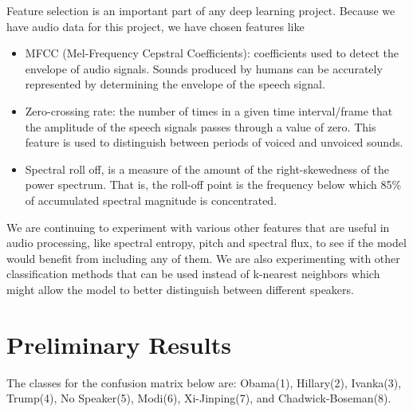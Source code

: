 \documentclass[10pt,twocolumn,letterpaper]{article}
\begin{document}
Feature selection is an important part of any deep learning project. Because we have audio data for this project, we have chosen features like 
\begin{itemize}
    \item MFCC (Mel-Frequency Cepstral Coefficients): coefficients used to detect the envelope of audio signals. Sounds produced by humans can be accurately represented by determining the envelope of the speech signal.
    \item Zero-crossing rate: the number of times in a given time interval/frame that the amplitude of the speech signals passes through a value of zero. This feature is used to distinguish between periods of voiced and unvoiced sounds.
    \item Spectral roll off, is a measure of the amount of the right-skewedness of the power spectrum. That is, the roll-off point is the frequency below which 85\% of accumulated spectral magnitude is concentrated.
\end{itemize}

We are continuing to experiment with various other features that are useful in audio processing, like spectral entropy, pitch and spectral flux, to see if the model would benefit from including any of them. We are also experimenting with other classification methods that can be used instead of k-nearest neighbors which might allow the model to better distinguish between different speakers.


\section{Preliminary Results}

The classes for the confusion matrix below are: Obama(1), Hillary(2), Ivanka(3), Trump(4), No Speaker(5), Modi(6), Xi-Jinping(7), and Chadwick-Boseman(8).
\end{document}
